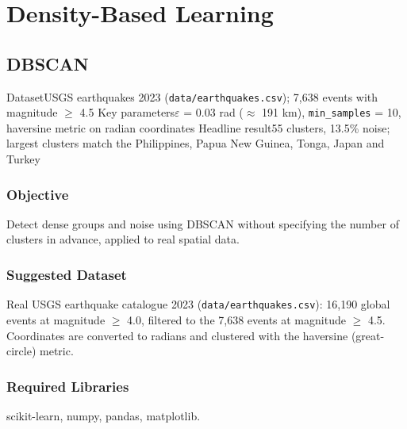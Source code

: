
\part{Density-Based Learning}

\chapter{DBSCAN}\label{exp:05}


\quickfacts
  {Dataset}{USGS earthquakes 2023 (\texttt{data/earthquakes.csv}); 7,638 events with magnitude $\ge$ 4.5}
  {Key parameters}{$\varepsilon$ = 0.03 rad ($\approx$ 191 km), \texttt{min\_samples} = 10, haversine metric on radian coordinates}
  {Headline result}{55 clusters, 13.5\% noise; largest clusters match the Philippines, Papua New Guinea, Tonga, Japan and Turkey}

\section{Objective}
Detect dense groups and noise using DBSCAN without specifying the number of clusters in
advance, applied to real spatial data.

\section{Suggested Dataset}
Real USGS earthquake catalogue 2023 (\texttt{data/earthquakes.csv}): 16,190 global events at
magnitude $\ge$ 4.0, filtered to the 7,638 events at magnitude $\ge$ 4.5. Coordinates are
converted to radians and clustered with the haversine (great-circle) metric.

\section{Required Libraries}
scikit-learn, numpy, pandas, matplotlib.

